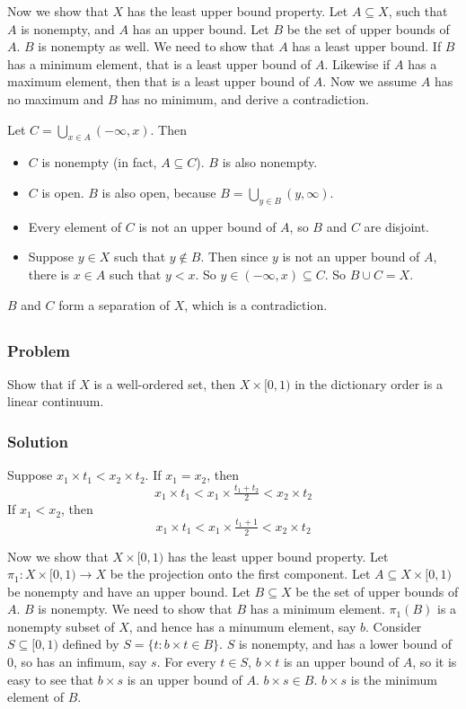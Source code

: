 Now we show that $X$ has the least upper bound property. Let $A \subseteq X$, such that $A$ is nonempty, and $A$ has an upper bound. Let $B$ be the set of upper bounds of $A$. $B$ is nonempty as well. We need to show that $A$ has a least upper bound. If $B$ has a minimum element, that is a least upper bound of $A$. Likewise if $A$ has a maximum element, then that is a least upper bound of $A$. Now we assume $A$ has no maximum and $B$ has no minimum, and derive a contradiction.

Let $C = \bigcup_{x \in A} (-\infty, x)$. Then 
\begin{itemize}
\item $C$ is nonempty (in fact, $A \subseteq C$). $B$ is also nonempty.
\item $C$ is open. $B$ is also open, because $B = \bigcup_{y \in B} (y, \infty)$.
\item Every element of $C$ is not an upper bound of $A$, so $B$ and $C$ are disjoint.
\item Suppose $y \in X$ such that $y \notin B$. Then since $y$ is not an upper bound of $A$, there is $x \in A$ such that $y < x$. So $y \in (-\infty, x) \subseteq C$. So $B \cup C = X$.
\end{itemize}
$B$ and $C$ form a separation of $X$, which is a contradiction.


\setcounter{subsection}{5} %
\subsection{}

\subsubsection{Problem}
Show that if $X$ is a well-ordered set, then $X \times [0,1)$ in the dictionary order is a linear continuum.

\subsubsection{Solution}
Suppose $x_1 \times t_1 < x_2 \times t_2$. If $x_1 = x_2$, then
\[x_1 \times t_1 <x_1 \times \tfrac{t_1+t_2}{2} <x_2 \times t_2\]
If $x_1 < x_2$, then
\[x_1 \times t_1 <x_1 \times \tfrac{t_1+1}{2} <x_2 \times t_2\]

Now we show that $X \times [0,1)$ has the least upper bound property. Let $\pi_1 : X \times [0,1) \to X$ be the projection onto the first component. Let $A \subseteq X \times [0,1)$ be nonempty and have an upper bound. Let $B \subseteq X$ be the set of upper bounds of $A$. $B$ is nonempty. We need to show that $B$ has a minimum element. $\pi_1(B)$ is a nonempty subset of $X$, and hence has a minumum element, say $b$. Consider $S \subseteq [0,1)$ defined by $S = \{t : b \times t \in B\}$. $S$ is nonempty, and has a lower bound of $0$, so has an infimum, say $s$. For every $t \in S$, $b \times t$ is an upper bound of $A$, so it is easy to see that $b \times s$ is an upper bound of $A$. $b \times s \in B$. $b \times s$ is the minimum element of $B$.

